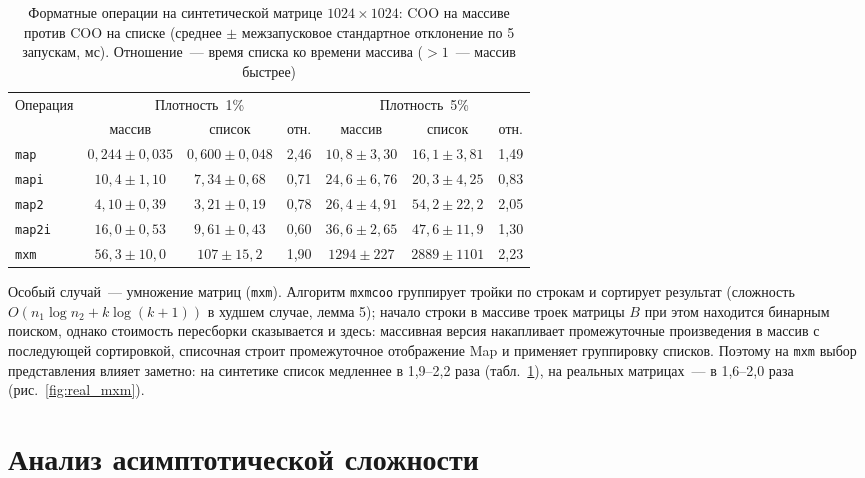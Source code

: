 \documentclass[a4paper]{article}
\begin{document}
\begin{table}[H]
    \centering
    \caption{Форматные операции на синтетической матрице $1024\times1024$: COO на массиве против COO на списке (среднее $\pm$ межзапусковое стандартное отклонение по 5 запускам, мс). Отношение~--- время списка ко времени массива ($>1$~--- массив быстрее)}
    \label{tab:array_vs_list_format}
    \footnotesize
    \begin{tabular}{lcccccc}
        \toprule
        \multirow{2}{*}{Операция} & \multicolumn{3}{c}{Плотность~1\%} & \multicolumn{3}{c}{Плотность~5\%} \\
        \cmidrule(lr){2-4} \cmidrule(lr){5-7}
        & массив & список & отн. & массив & список & отн. \\
        \midrule
        \texttt{map}   & $0{,}244 \pm 0{,}035$ & $0{,}600 \pm 0{,}048$ & 2,46 & $10{,}8 \pm 3{,}30$ & $16{,}1 \pm 3{,}81$ & 1,49 \\
        \texttt{mapi}  & $10{,}4 \pm 1{,}10$ & $7{,}34 \pm 0{,}68$ & 0,71 & $24{,}6 \pm 6{,}76$ & $20{,}3 \pm 4{,}25$ & 0,83 \\
        \texttt{map2}  & $4{,}10 \pm 0{,}39$ & $3{,}21 \pm 0{,}19$ & 0,78 & $26{,}4 \pm 4{,}91$ & $54{,}2 \pm 22{,}2$ & 2,05 \\
        \texttt{map2i} & $16{,}0 \pm 0{,}53$ & $9{,}61 \pm 0{,}43$ & 0,60 & $36{,}6 \pm 2{,}65$ & $47{,}6 \pm 11{,}9$ & 1,30 \\
        \texttt{mxm}   & $56{,}3 \pm 10{,}0$ & $107 \pm 15{,}2$ & 1,90 & $1294 \pm 227$ & $2889 \pm 1101$ & 2,23 \\
        \bottomrule
    \end{tabular}
\end{table}

Особый случай~--- умножение матриц (\texttt{mxm}). Алгоритм \texttt{mxmcoo} группирует тройки по строкам и сортирует результат (сложность $O(n_1\log n_2 + k\log(k+1))$ в худшем случае, лемма 5); начало строки в массиве троек матрицы $B$ при этом находится бинарным поиском, однако стоимость пересборки сказывается и здесь: массивная версия накапливает промежуточные произведения в массив с последующей сортировкой, списочная строит промежуточное отображение Map и применяет группировку списков. Поэтому на \texttt{mxm} выбор представления влияет заметно: на синтетике список медленнее в 1,9--2,2 раза (табл.~\ref{tab:array_vs_list_format}), на реальных матрицах~--- в 1,6--2,0 раза (рис.~\ref{fig:real_mxm}).


\section{Анализ асимптотической сложности}
\label{sec:asympt}
\end{document}
